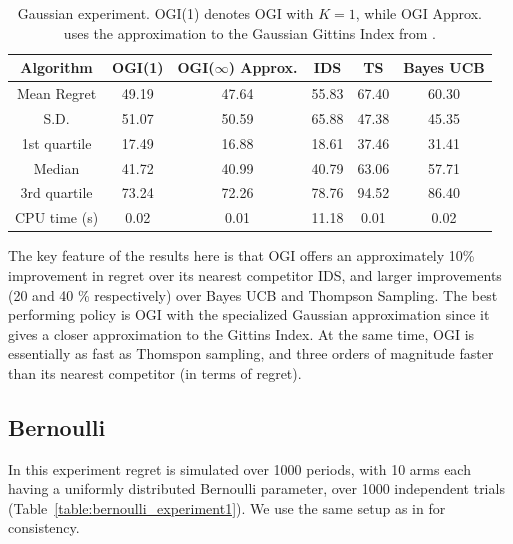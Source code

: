 \begin{table}[h!]
	\centering
	\begin{tabular}{| c | c | c | c | c | c |} \hline
		\textbf{Algorithm}  & \textbf{OGI(1)} & \textbf{OGI($\infty$) Approx.} & \textbf{IDS} & \textbf{TS} & \textbf{Bayes UCB}\\ \hline
		Mean Regret   & 49.19 & 47.64  &  55.83 & 67.40 & 60.30  \\ \hline
		S.D.  & 51.07 & 50.59 & 65.88 & 47.38 & 45.35 \\ \hline
		1st quartile  & 17.49 & 16.88  & 18.61 & 37.46 & 31.41 \\ \hline
		Median  & 41.72 & 40.99 & 40.79 & 63.06 & 57.71 \\ \hline
		3rd quartile  & 73.24 & 72.26 & 78.76 & 94.52 & 86.40 \\ \hline
		CPU time (s) & 0.02 & 0.01 & 11.18 & 0.01 & 0.02 \\ \hline
	\end{tabular}
	\caption[Table caption text]{Gaussian experiment. OGI(1) denotes OGI with $K =1$, while OGI Approx. uses the approximation to the Gaussian Gittins Index from \cite{powell2012optimal}.}
	\label{table:gaussian_experiment1}
\end{table}

The key feature of the results here is that OGI offers an approximately 10\% improvement in regret over its nearest competitor IDS, and larger improvements (20 and 40 \% respectively) over Bayes UCB and Thompson Sampling. The best performing policy is OGI with the specialized Gaussian approximation since it gives a closer approximation to the Gittins Index. At the same time, OGI is essentially as fast as Thomspon sampling, and three orders of magnitude faster than its nearest competitor (in terms of regret). 


\subsection{Bernoulli}
In this experiment regret is simulated over 1000 periods, with 10 arms each having a uniformly distributed Bernoulli parameter, over 1000 independent trials (Table~\ref{table:bernoulli_experiment1}). We use the same setup as in \cite{russo2014learning} for consistency. 

